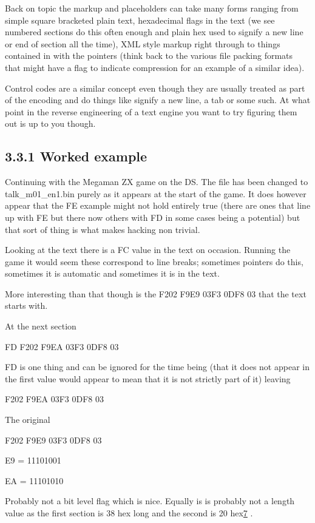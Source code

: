 \documentclass[
]{book}
\begin{document}
Back on topic the markup and placeholders can take many forms ranging from simple square bracketed plain text, hexadecimal flags in the text (we see numbered sections do this often enough and plain hex used to signify a new line or end of section all the time), XML style markup right through to things contained in with the pointers (think back to the various file packing formats that might have a flag to indicate compression for an example of a similar idea).

Control codes are a similar concept even though they are usually treated as part of the encoding and do things like signify a new line, a tab or some such. At what point in the reverse engineering of a text engine you want to try figuring them out is up to you though.

\hypertarget{worked-example}{%
\subsection{3.3.1 Worked example}\label{worked-example}}

Continuing with the Megaman ZX game on the DS. The file has been changed to talk\_m01\_en1.bin purely as it appears at the start of the game. It does however appear that the FE example might not hold entirely true (there are ones that line up with FE but there now others with FD in some cases being a potential) but that sort of thing is what makes hacking non trivial.

Looking at the text there is a FC value in the text on occasion. Running the game it would seem these correspond to line breaks; sometimes pointers do this, sometimes it is automatic and sometimes it is in the text.

More interesting than that though is the F202 F9E9 03F3 0DF8 03 that the text starts with.

At the next section

FD F202 F9EA 03F3 0DF8 03

FD is one thing and can be ignored for the time being (that it does not appear in the first value would appear to mean that it is not strictly part of it) leaving

F202 F9EA 03F3 0DF8 03

The original

F202 F9E9 03F3 0DF8 03

E9 = 11101001

EA = 11101010

Probably not a bit level flag which is nice. Equally is is probably not a length value as the first section is 38 hex long and the second is 20 hex\href{romhacking20208.html\#fn7x0}{7} .
\end{document}
